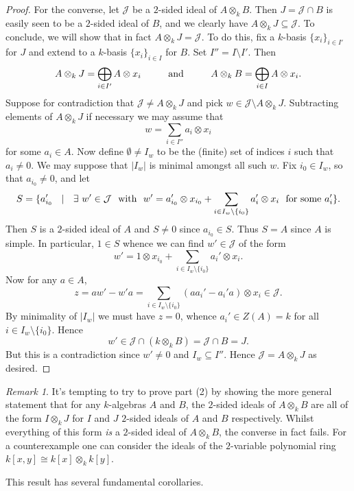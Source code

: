 \documentclass[11pt]{amsart}
\numberwithin{equation}{section}
\theoremstyle{remark}
\newtheorem{remark}[equation]{Remark}
\theoremstyle{remark}
\theoremstyle{remark}
\theoremstyle{definition}
\theoremstyle{definition}
\theoremstyle{definition}
\theoremstyle{definition}
\theoremstyle{definition}
\theoremstyle{definition}
\begin{document}
\begin{proof}
For the converse, let $\mathcal{J}$ be a $2$-sided ideal of $A\otimes_k B$. Then $J=\mathcal{J}\cap B$ is easily seen to be a $2$-sided ideal of $B$, and we clearly have $A\otimes_k J\subseteq \mathcal{J}$. To conclude, we will show that in fact $A\otimes_k J= \mathcal{J}$. To do this, fix a $k$-basis $\{x_i\}_{i\in I'}$ for $J$ and extend to a $k$-basis $\{x_i\}_{i\in I}$ for $B$. Set $I''=I\setminus I'$. Then 
\[A\otimes_k J=\bigoplus_{i\in I'}A\otimes x_i~~\phantom{hello}\textup{and}~~\phantom{hello}A\otimes_k B=\bigoplus_{i\in I}A\otimes x_i.\]
Suppose for contradiction that $\mathcal{J}\neq A\otimes_k J$ and pick $w\in \mathcal{J}\setminus A\otimes_k J$. Subtracting elements of $A\otimes_k J$ if necessary we may assume that 
\[w=\sum_{i\in I''}a_i\otimes x_i\]
for some $a_i\in A$. Now define $\emptyset \neq I_w$ to be the (finite) set of indices $i$ such that $a_i\neq 0$. We may suppose that $|I_w|$ is minimal amongst all such $w$. Fix $i_0\in I_w$, so that $a_{i_0}\neq 0$, and let
\[S=\{a_{i_0}'~~\mid~~\exists~ w'\in \mathcal{J}~~\textup{with}~~w'=a_{i_0}'\otimes x_{i_0}+\sum_{i\in I_w\setminus \{i_0\}}a_i'\otimes x_i~~\textup{for some }a_i'\}.\]
Then $S$ is a $2$-sided ideal of $A$ and $S\neq 0$ since $a_{i_0}\in S$. Thus $S=A$ since $A$ is simple. In particular, $1\in S$ whence we can find $w'\in \mathcal{J}$ of the form
\[w'=1\otimes x_{i_0}+\sum_{i\in I_w\setminus \{i_0\}}a_i'\otimes x_i.\]
Now for any $a\in A$, 
\[z=aw'-w'a=\sum_{i\in I_w\setminus\{i_0\}}(aa_i'-a_i'a)\otimes x_i \in \mathcal{J}.\]
By minimality of $|I_w|$ we must have $z=0$, whence $a_i'\in Z(A)=k$ for all $i\in I_w\setminus\{i_0\}$. Hence
\[w'\in \mathcal{J}\cap (k\otimes_k B)=\mathcal{J}\cap B=J.\]
But this is a contradiction since $w'\neq 0$ and $I_w\subseteq I''$. Hence $\mathcal{J}=A\otimes_k J$ as desired.
\end{proof}

\begin{remark}
It's tempting to try to prove part (2) by showing the more general statement  that for any $k$-algebras $A$ and $B$, the $2$-sided ideals of $A\otimes_k B$ are all of the form $I\otimes_kJ $ for $I$ and $J$ $2$-sided ideals of $A$ and $B$ respectively. Whilst everything of this form \textit{is} a $2$-sided ideal of $A\otimes_k B$, the converse in fact fails. For a counterexample one can consider the ideals of the $2$-variable polynomial ring $k[x,y]\cong k[x]\otimes_k k[y]$.
\end{remark}

This result has several fundamental corollaries.
\end{document}
